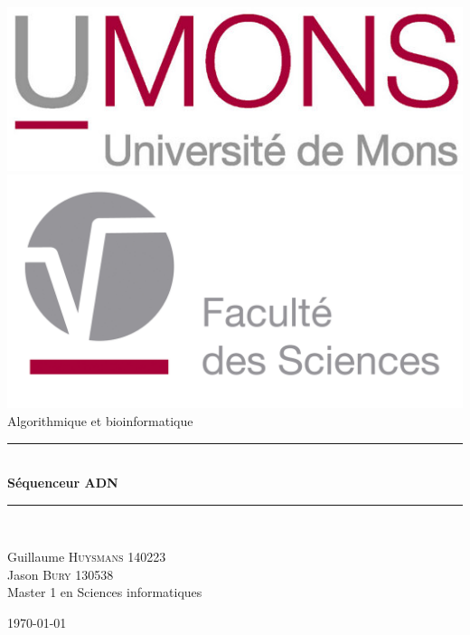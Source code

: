 \newcommand{\myTitleOfTitlepage}{Séquenceur ADN}
\newcommand{\courseTitleOfTitlepage}{Algorithmique et bioinformatique}

\begin{titlepage}
\begin{center}
\includegraphics[scale=1.50]{figures/UMONS.jpg}\\[0.4cm]
\includegraphics[scale=0.30]{figures/FS_Logo.jpg}\\[3cm]
{\huge \courseTitleOfTitlepage}\\
\vspace{0.9mm}
\rule{9.5cm}{0.5mm}\\[0.5cm]
{\huge \bfseries \myTitleOfTitlepage}\\[0.2cm]
\rule{9.5cm}{0.5mm}\\[7cm]
      \begin{flushleft} \large
        Guillaume \textsc{Huysmans} 140223\\
        Jason \textsc{Bury} 130538\\
        Master 1 en Sciences informatiques\\
      \end{flushleft}
   \vfill
  {\large \today}
\end{center}
\end{titlepage}